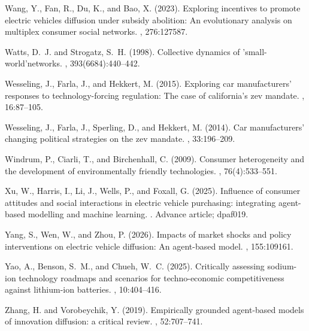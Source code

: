 \documentclass[12pt]{article}
\begin{document}
\begin{thebibliography}{}
Wang, Y., Fan, R., Du, K., and Bao, X. (2023).
\newblock Exploring incentives to promote electric vehicles diffusion under
  subsidy abolition: An evolutionary analysis on multiplex consumer social
  networks.
, 276:127587.

Watts, D.~J. and Strogatz, S.~H. (1998).
\newblock Collective dynamics of 'small-world'networks.
, 393(6684):440--442.

Wesseling, J., Farla, J., and Hekkert, M. (2015).
\newblock Exploring car manufacturers' responses to technology-forcing
  regulation: The case of california's zev mandate.
, 16:87--105.

Wesseling, J., Farla, J., Sperling, D., and Hekkert, M. (2014).
\newblock Car manufacturers' changing political strategies on the zev
  mandate.
,
  33:196--209.

Windrum, P., Ciarli, T., and Birchenhall, C. (2009).
\newblock Consumer heterogeneity and the development of environmentally
  friendly technologies.
, 76(4):533--551.

Xu, W., Harris, I., Li, J., Wells, P., and Foxall, G. (2025).
\newblock Influence of consumer attitudes and social interactions in electric
  vehicle purchasing: integrating agent-based modelling and machine learning.
.
\newblock Advance article; dpaf019.

Yang, S., Wen, W., and Zhou, P. (2026).
\newblock Impacts of market shocks and policy interventions on electric vehicle
  diffusion: An agent-based model.
, 155:109161.

Yao, A., Benson, S.~M., and Chueh, W.~C. (2025).
\newblock Critically assessing sodium-ion technology roadmaps and scenarios for
  techno-economic competitiveness against lithium-ion batteries.
, 10:404--416.

Zhang, H. and Vorobeychik, Y. (2019).
\newblock Empirically grounded agent-based models of innovation diffusion: a
  critical review.
, 52:707--741.


\end{thebibliography}
\end{document}
